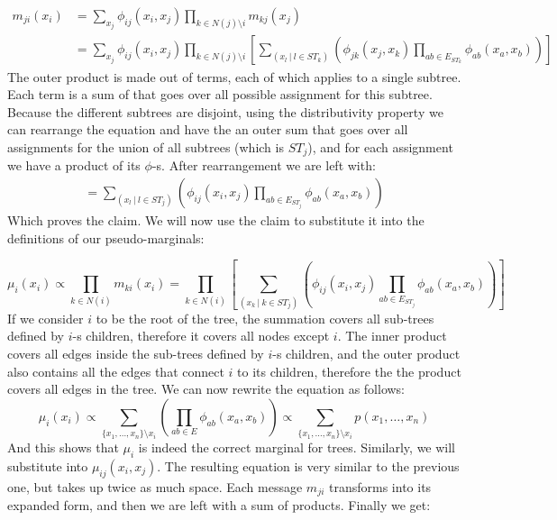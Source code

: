 \documentclass[11pt]{article}
\begin{document}
\begin{align}
m_{ji}(x_i) &= \sum_{x_j} \phi_{ij}(x_i,x_j) \prod_{k \in N(j) \setminus i} m_{kj}(x_j)\\
 &= \sum_{x_j} \phi_{ij}(x_i,x_j) \prod_{k \in N(j) \setminus i}
\left[
	\sum_{(x_l\ |\ l \in ST_k)} \left( \phi_{jk}(x_j,x_k) \prod_{ab \in E_{ST_k}} \phi_{ab}(x_a,x_b) \right) \right]
\end{align}
The outer product is made out of terms, each of which applies to a single subtree.
Each term is a sum of that goes over all possible assignment for this subtree.
Because the different subtrees are disjoint, using the distributivity property we can rearrange the equation and have the an outer sum that goes over all assignments for the union of all subtrees (which is $ST_j$), and for each assignment we have a product of its $\phi$-s.
After rearrangement we are left with:
\begin{align}
= \sum_{(x_l\ |\ l \in ST_j)} \left( \phi_{ij}(x_i,x_j) \prod_{ab \in E_{ST_j}} \phi_{ab}(x_a,x_b) \right)
\end{align}
Which proves the claim.
We will now use the claim to substitute it into the definitions of our pseudo-marginals:

\begin{equation}
\mu_{i}(x_i) \propto \prod_{k \in N(i)} m_{ki}(x_i)
= \prod_{k \in N(i)} \left[ \sum_{(x_k\ |\ k \in ST_j)} \left( \phi_{ij}(x_i,x_j) \prod_{ab \in E_{ST_j}} \phi_{ab}(x_a,x_b) \right) \right]
\end{equation}
If we consider $i$ to be the root of the tree,
the summation covers all sub-trees defined by $i$-s children, therefore it covers all nodes except $i$. The inner product covers all edges inside the sub-trees defined by $i$-s children, and the outer product also contains all the edges that connect $i$ to its children, therefore the the product covers all edges in the tree. We can now rewrite the equation as follows:
\begin{equation}
\mu_{i}(x_i) \propto \sum_{\{x_1,\ldots,x_n\}\setminus x_i} \left( \prod_{ab \in E} \phi_{ab}(x_a,x_b) \right) \propto \sum_{\{x_1,\ldots,x_n\}\setminus x_i} p(x_1,\ldots,x_n)
\end{equation}
And this shows that $\mu_i$ is indeed the correct marginal for trees. Similarly, we will substitute into $\mu_{ij}(x_i, x_j)$. The resulting equation is very similar to the previous one, but takes up twice as much space.
Each message $m_{ji}$ transforms into its expanded form, and then we are left with a sum of products. Finally we get:
\end{document}
